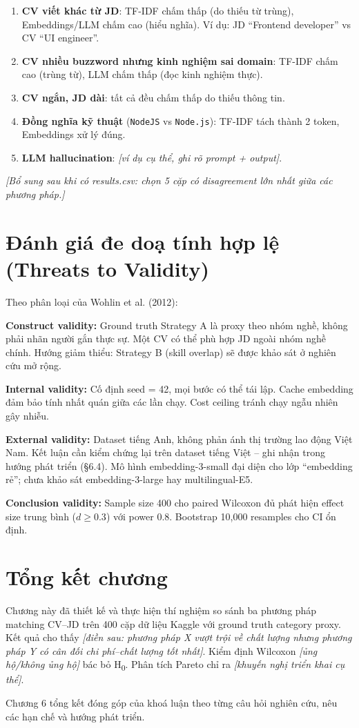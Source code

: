\documentclass[../DoAn.tex]{subfiles}
\begin{document}
\begin{enumerate}
    \item \textbf{CV viết khác từ JD}: TF-IDF chấm thấp (do thiếu từ trùng), Embeddings/LLM chấm cao (hiểu nghĩa). Ví dụ: JD ``Frontend developer'' vs CV ``UI engineer''.
    \item \textbf{CV nhiều buzzword nhưng kinh nghiệm sai domain}: TF-IDF chấm cao (trùng từ), LLM chấm thấp (đọc kinh nghiệm thực).
    \item \textbf{CV ngắn, JD dài}: tất cả đều chấm thấp do thiếu thông tin.
    \item \textbf{Đồng nghĩa kỹ thuật} (\texttt{NodeJS} vs \texttt{Node.js}): TF-IDF tách thành 2 token, Embeddings xử lý đúng.
    \item \textbf{LLM hallucination}: \textit{[ví dụ cụ thể, ghi rõ prompt + output]}.
\end{enumerate}

\textit{[Bổ sung sau khi có results.csv: chọn 5 cặp có disagreement lớn nhất giữa các phương pháp.]}

\section{Đánh giá đe doạ tính hợp lệ (Threats to Validity)}
\label{sec:threats}

Theo phân loại của Wohlin et al. (2012):

\textbf{Construct validity:} Ground truth Strategy A là proxy theo nhóm nghề, không phải nhãn người gắn thực sự. Một CV có thể phù hợp JD ngoài nhóm nghề chính. Hướng giảm thiểu: Strategy B (skill overlap) sẽ được khảo sát ở nghiên cứu mở rộng.

\textbf{Internal validity:} Cố định seed = 42, mọi bước có thể tái lập. Cache embedding đảm bảo tính nhất quán giữa các lần chạy. Cost ceiling tránh chạy ngẫu nhiên gây nhiễu.

\textbf{External validity:} Dataset tiếng Anh, không phản ánh thị trường lao động Việt Nam. Kết luận cần kiểm chứng lại trên dataset tiếng Việt -- ghi nhận trong hướng phát triển (\S 6.4). Mô hình embedding-3-small đại diện cho lớp ``embedding rẻ''; chưa khảo sát embedding-3-large hay multilingual-E5.

\textbf{Conclusion validity:} Sample size 400 cho paired Wilcoxon đủ phát hiện effect size trung bình ($d \geq 0.3$) với power 0.8. Bootstrap 10,000 resamples cho CI ổn định.

\section{Tổng kết chương}

Chương này đã thiết kế và thực hiện thí nghiệm so sánh ba phương pháp matching CV--JD trên 400 cặp dữ liệu Kaggle với ground truth category proxy. Kết quả cho thấy \textit{[điền sau: phương pháp X vượt trội về chất lượng nhưng phương pháp Y có cân đối chi phí--chất lượng tốt nhất]}. Kiểm định Wilcoxon \textit{[ủng hộ/không ủng hộ]} bác bỏ H\textsubscript{0}. Phân tích Pareto chỉ ra \textit{[khuyến nghị triển khai cụ thể]}.

Chương 6 tổng kết đóng góp của khoá luận theo từng câu hỏi nghiên cứu, nêu các hạn chế và hướng phát triển.
\end{document}
